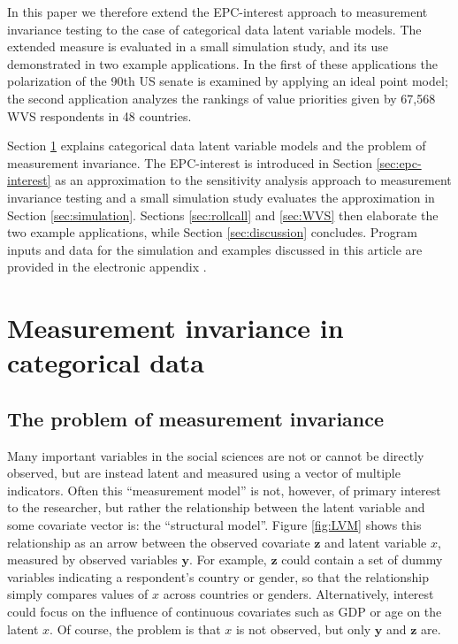 \documentclass[letterpaper,12pt]{article}
\begin{document}

In this paper we therefore extend the EPC-interest approach to measurement invariance testing  to  the case of categorical data latent variable models. The extended measure is evaluated in a small simulation study, and its use demonstrated in two example applications. In the first of these applications the polarization of the 90th US senate is examined by applying an ideal point model; the second application analyzes the rankings of value priorities given by 67,568 WVS respondents in 48 countries. 


\bigskip
Section \ref{sec:invariance} explains categorical data latent variable models  and the problem of measurement invariance. The EPC-interest is introduced in Section \ref{sec:epc-interest} as an approximation to the sensitivity analysis approach to measurement invariance testing and a small simulation study evaluates the approximation in Section \ref{sec:simulation}. Sections \ref{sec:rollcall} and \ref{sec:WVS} then elaborate the two example applications, while Section \ref{sec:discussion} concludes. 
Program inputs and data for the simulation and examples discussed in this article are provided in the electronic appendix \citep{oberski2015replication}.


\section{Measurement invariance in categorical data}
\label{sec:invariance}
\subsection{The problem of measurement invariance}

Many important variables in the social sciences are not or cannot be directly observed, but are instead latent  \citep{bollen2002latent} and measured using a vector of multiple indicators.
Often this ``measurement model'' is not, however, of primary interest to the researcher, but rather  the relationship between the latent variable and some covariate vector is: the ``structural model''. Figure \ref{fig:LVM} shows this relationship as an arrow between the observed covariate $\mathbf{z}$ and latent variable $x$, measured by observed variables $\mathbf{y}$.
For example, $\mathbf{z}$ could contain a set of dummy variables indicating a respondent's country or gender, so that the relationship simply compares values of $x$ across countries or genders. Alternatively, interest could focus on the influence of continuous covariates such as GDP or age on the latent $x$. Of course, the problem is that $x$ is not observed, but only $\mathbf{y}$ and $\mathbf{z}$ are. 
\end{document}
